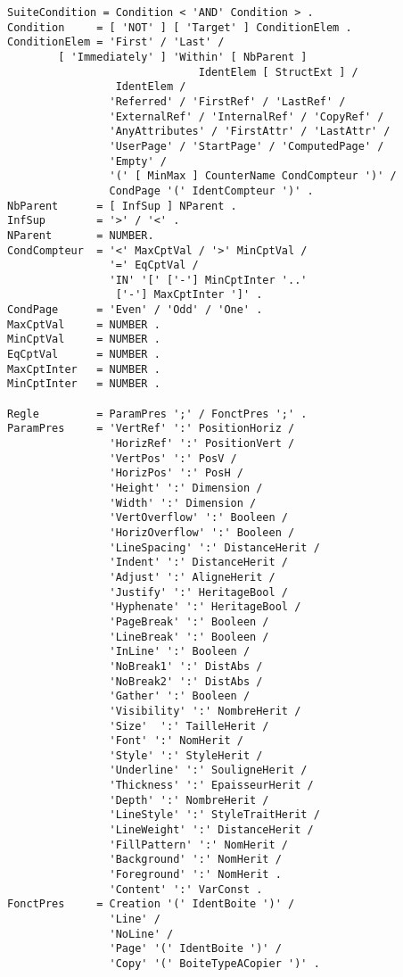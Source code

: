 {\begin{verbatim}
SuiteCondition = Condition < 'AND' Condition > .
Condition     = [ 'NOT' ] [ 'Target' ] ConditionElem .
ConditionElem = 'First' / 'Last' /
		[ 'Immediately' ] 'Within' [ NbParent ]
                              IdentElem [ StructExt ] /
                 IdentElem /
                'Referred' / 'FirstRef' / 'LastRef' /
                'ExternalRef' / 'InternalRef' / 'CopyRef' /
                'AnyAttributes' / 'FirstAttr' / 'LastAttr' /
                'UserPage' / 'StartPage' / 'ComputedPage' /
                'Empty' /
                '(' [ MinMax ] CounterName CondCompteur ')' /
                CondPage '(' IdentCompteur ')' .
NbParent      = [ InfSup ] NParent .
InfSup        = '>' / '<' .
NParent       = NUMBER.
CondCompteur  = '<' MaxCptVal / '>' MinCptVal /
                '=' EqCptVal / 
                'IN' '[' ['-'] MinCptInter '..' 
                 ['-'] MaxCptInter ']' .
CondPage      = 'Even' / 'Odd' / 'One' .
MaxCptVal     = NUMBER .
MinCptVal     = NUMBER .
EqCptVal      = NUMBER .
MaxCptInter   = NUMBER .
MinCptInter   = NUMBER .

Regle         = ParamPres ';' / FonctPres ';' .
ParamPres     = 'VertRef' ':' PositionHoriz /
                'HorizRef' ':' PositionVert /
                'VertPos' ':' PosV /
                'HorizPos' ':' PosH /
                'Height' ':' Dimension /
                'Width' ':' Dimension /
                'VertOverflow' ':' Booleen /
                'HorizOverflow' ':' Booleen /
                'LineSpacing' ':' DistanceHerit /
                'Indent' ':' DistanceHerit /
                'Adjust' ':' AligneHerit /
                'Justify' ':' HeritageBool /
                'Hyphenate' ':' HeritageBool /
                'PageBreak' ':' Booleen /
                'LineBreak' ':' Booleen /
                'InLine' ':' Booleen /
                'NoBreak1' ':' DistAbs /
                'NoBreak2' ':' DistAbs /
                'Gather' ':' Booleen /
                'Visibility' ':' NombreHerit /
                'Size'  ':' TailleHerit /
                'Font' ':' NomHerit /
                'Style' ':' StyleHerit /
                'Underline' ':' SouligneHerit /
                'Thickness' ':' EpaisseurHerit /
                'Depth' ':' NombreHerit /
                'LineStyle' ':' StyleTraitHerit /
                'LineWeight' ':' DistanceHerit /
                'FillPattern' ':' NomHerit /
                'Background' ':' NomHerit /
                'Foreground' ':' NomHerit .
                'Content' ':' VarConst .
FonctPres     = Creation '(' IdentBoite ')' /
                'Line' /
                'NoLine' /
                'Page' '(' IdentBoite ')' /
                'Copy' '(' BoiteTypeACopier ')' .


\end{verbatim}}
